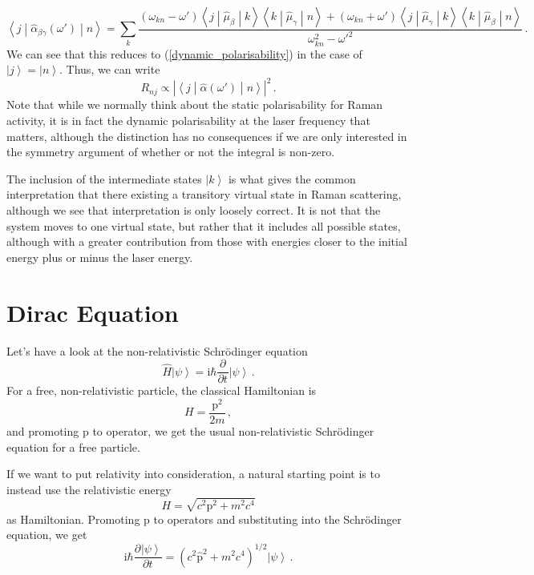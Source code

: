\documentclass{article}
\theoremstyle{plain}\theoremheaderfont{\normalfont\itshape}\theorembodyfont{\rmfamily}\theoremseparator{.}\newtheorem*{rem}{Remark}\newtheorem*{ex}{Example}\newtheorem*{proof}{Proof}\newtheorem*{altp}{Alternative proof}
\theoremstyle{plain}\theoremheaderfont{\normalfont\bfseries}\theorembodyfont{\rmfamily}\theoremseparator{.}\newtheorem{thm}{Theorem}[section]\newtheorem{lem}[thm]{Lemma}\newtheorem{prop}[thm]{Proposition}\newtheorem*{cor}{Corollary}\newtheorem{defn}[thm]{Definition}\newtheorem{clm}[thm]{Claim}\newtheorem{clminproof}{Claim}
\theoremstyle{break}\theoremheaderfont{\normalfont\itshape}\theorembodyfont{\rmfamily}\theoremseparator{.\medskip}\newtheorem*{proofskip}{Proof}\newtheorem*{exs}{Examples}\newtheorem*{rems}{Remarks}
\theoremstyle{break}\theoremheaderfont{\normalfont\bfseries}\theorembodyfont{\rmfamily}\theoremseparator{.\medskip}\newtheorem{lemskip}[thm]{Lemma}\newtheorem{defnskip}[thm]{Definition}\newtheorem{propskip}[thm]{Proposition}\newtheorem{thmskip}[thm]{Theorem}
\numberwithin{equation}{section}
\newcommand{\ii}{\mathrm{i}}
\newcommand{\pdv}[3][]{\frac{\partial^{#1} #2}{{\partial #3}^{#1}}}
\newcommand{\ket}[1]{\left| #1 \right\rangle}
\newcommand{\mel}[3]{\left\langle #1 \middle| #2 \middle| #3 \right\rangle}
\newcommand{\vb}[1]{\bm{\mathrm{#1}}}
\newcommand{\abs}[1]{\left| #1 \right|}
\begin{document}
    \begin{equation}
        \mel{j}{\hat{\alpha}_{\beta\gamma}(\omega')}{n}=\sum_k\frac{(\omega_{kn}-\omega')\mel{j}{\hat{\mu}_\beta}{k}\mel{k}{\hat{\mu}_\gamma}{n}+(\omega_{kn}+\omega')\mel{j}{\hat{\mu}_\gamma}{k}\mel{k}{\hat{\mu}_\beta}{n}}{\omega_{kn}^2-\omega'^2}\,.
    \end{equation}
    We can see that this reduces to (\ref{dynamic_polarisability}) in the case of \(\ket{j}=\ket{n}\). Thus, we can write
    \begin{equation}
        R_{nj}\propto\abs{\mel{j}{\hat{\alpha}(\omega')}{n}}^2\,.
    \end{equation}
    Note that while we normally think about the static polarisability for Raman activity, it is in fact the dynamic polarisability at the laser frequency that matters, although the distinction has no consequences if we are only interested in the symmetry argument of whether or not the integral is non-zero.

    The inclusion of the intermediate states \(\ket{k}\) is what gives the common interpretation that there existing a transitory virtual state in Raman scattering, although we see that interpretation is only loosely correct. It is not that the system moves to one virtual state, but rather that it includes all possible states, although with a greater contribution from those with energies closer to the initial energy plus or minus the laser energy.

    \section{Dirac Equation}\label{Chap:Dirac_eqn}
    Let's have a look at the non-relativistic Schr\"{o}dinger equation
    \begin{equation}
        \hat{H}\ket{\psi}=\ii\hbar\pdv{}{t}\ket{\psi}\,.
    \end{equation}
    For a free, non-relativistic particle, the classical Hamiltonian is
    \begin{equation}
        H=\frac{\vb{p}^2}{2m}\,,
    \end{equation}
    and promoting \(\vb{p}\) to operator, we get the usual non-relativistic Schr\"{o}dinger equation for a free particle.

    If we want to put relativity into consideration, a natural starting point is to instead use the relativistic energy
    \begin{equation}\label{relativistic_energy}
        H=\sqrt{c^2\vb{p}^2+m^2 c^4}
    \end{equation}
    as Hamiltonian. Promoting \(\vb{p}\) to operators and substituting into the Schr\"{o}dinger equation, we get
    \begin{equation}
        \ii\hbar\pdv{\ket{\psi}}{t}=(c^2\hat{\vb{p}}^2+m^2 c^4)^{1/2}\ket{\psi}\,.
    \end{equation}
\end{document}
